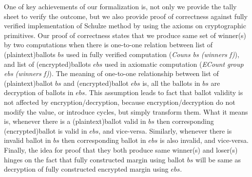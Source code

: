 \documentclass{llncs}
\begin{document}
One of key achievements of our formalization is,
not only we provide the tally sheet  
to verify the outcome, but we also provide 
proof of correctness against fully verified implementation of 
Schulze method \cite{Pattinson:2017:SVE} by using the 
axioms on cryptographic primitives. Our proof of correctness
states that we produce same set of winner(s) by two computations 
when there is one-to-one relation between list of (plaintext)ballots 
$bs$ used  in fully verified computation (\textit{Couns bs (winners f)}), 
and list of (encrypted)ballots $ebs$ used in axiomatic computation 
(\textit{ECount group ebs (winners f)}). The meaning of 
one-to-one relationship between list of (plaintext)ballot $bs$ and
(encrypted)ballot $ebs$ is, all the ballots in $bs$ are decryption
of ballots in $ebs$. This assumption leads to fact that
ballot validity is not affected by encryption/decryption, because 
encryption/decryption do not modify the value, or introduce 
cycles, but simply transform them. What it means is, whenever there is a (plaintext)ballot valid in 
$bs$ then corresponding (encrypted)ballot is valid in $ebs$, and vice-versa.
Similarly, whenever there is invalid ballot in $bs$ then 
corresponding ballot in $ebs$ is also invalid, and vice-versa.
Finally, the idea for proof that they both produce same winner(s) and 
loser(s) hinges on the 
fact that fully constructed margin using ballot $bs$ will be same as 
decryption of fully constructed encrypted margin using $ebs$. 
%
%
\end{document}
